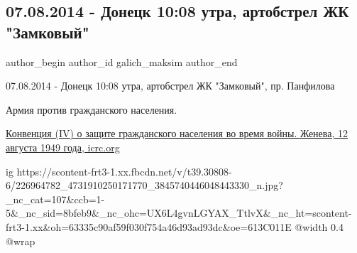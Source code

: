  
 
 
 
 
 
\subsection{07.08.2014 - Донецк 10:08 утра, артобстрел ЖК "Замковый"}
\label{sec:07_08_2021.fb.galich_maksim.1.doneck_zhk_zamkovyj_obstrel_07_08_2014}
 
\ifcmt
 author_begin
   author_id galich_maksim
 author_end
\fi

07.08.2014 - Донецк 10:08 утра, артобстрел ЖК "Замковый",  пр. Панфилова

Армия против гражданского населения. 

\href{https://www.icrc.org/ru/doc/resources/documents/misc/geneva-convention-4.htm}{%
Конвенция (IV) о защите гражданского населения во время войны. Женева, 12 августа 1949 года, icrc.org%
}

\ifcmt
  ig https://scontent-frt3-1.xx.fbcdn.net/v/t39.30808-6/226964782_4731910250171770_3845740446048443330_n.jpg?_nc_cat=107&ccb=1-5&_nc_sid=8bfeb9&_nc_ohc=UX6L4gvnLGYAX_TtlvX&_nc_ht=scontent-frt3-1.xx&oh=63335c90af59f030f754a46d93ad93dc&oe=613C011E
  @width 0.4
	@wrap \parpic[r]
\fi

